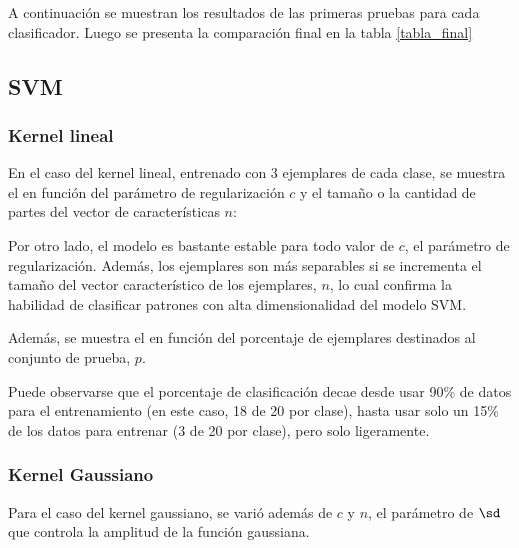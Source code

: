 A continuación se muestran los resultados de las primeras pruebas para cada clasificador. Luego se presenta la comparación final en la tabla \ref{tabla_final}

\subsection{SVM}

\subsubsection{Kernel lineal}
En el caso del kernel lineal, entrenado con $3$ ejemplares de cada clase, se muestra el \cc en función del parámetro de regularización $c$ y  el tamaño o la cantidad de partes del vector de características $n$:


Por otro lado, el modelo es bastante estable para todo valor de $c$, el parámetro de regularización. Además, los ejemplares son más separables si se incrementa el tamaño del vector característico de los ejemplares, $n$, lo cual confirma la habilidad de clasificar patrones con alta dimensionalidad del modelo SVM. 


Además, se muestra el \cc en función del porcentaje de ejemplares destinados al conjunto de prueba, $p$.


Puede observarse que el porcentaje de clasificación decae desde usar 90\% de datos para el entrenamiento (en este caso, 18 de 20 por clase),  hasta usar solo un 15\% de los datos para entrenar (3 de 20 por clase), pero solo ligeramente.


\subsubsection{Kernel Gaussiano}

Para el caso del kernel gaussiano, se varió además de $c$ y $n$, el parámetro de $\sd$ que controla la amplitud de la función gaussiana.



